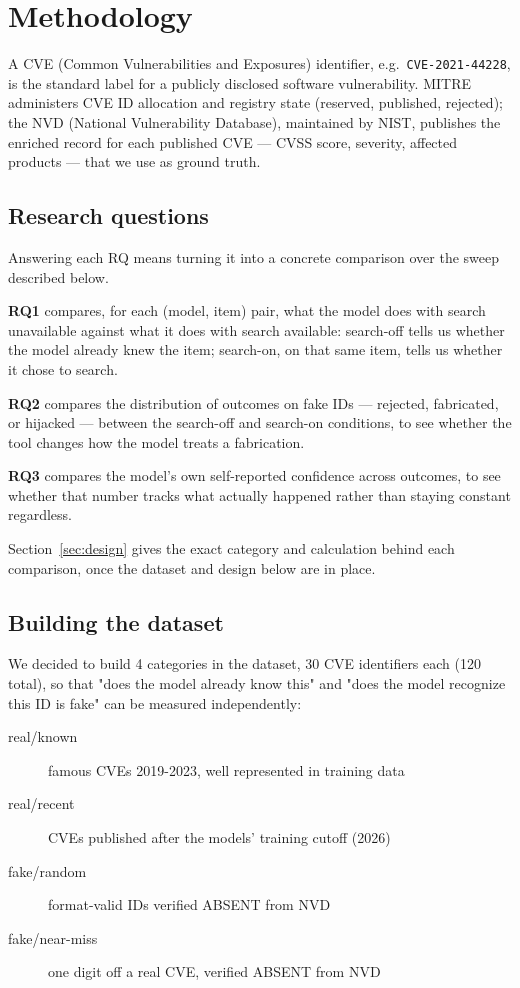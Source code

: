 \documentclass[11pt]{article}
\begin{document}
\section{Methodology}

A CVE (Common Vulnerabilities and Exposures) identifier, e.g.\ \texttt{CVE-2021-44228}, is the standard label for a publicly disclosed software vulnerability. MITRE administers CVE ID allocation and registry state (reserved, published, rejected); the NVD (National Vulnerability Database), maintained by NIST, publishes the enriched record for each published CVE — CVSS score, severity, affected products — that we use as ground truth.

\subsection{Research questions}
\label{sec:rqs}

Answering each RQ means turning it into a concrete comparison over the sweep described below.

\textbf{RQ1} compares, for each (model, item) pair, what the model does with search unavailable against what it does with search available: search-off tells us whether the model already knew the item; search-on, on that same item, tells us whether it chose to search.

\textbf{RQ2} compares the distribution of outcomes on fake IDs — rejected, fabricated, or hijacked — between the search-off and search-on conditions, to see whether the tool changes how the model treats a fabrication.

\textbf{RQ3} compares the model's own self-reported confidence across outcomes, to see whether that number tracks what actually happened rather than staying constant regardless.

Section~\ref{sec:design} gives the exact category and calculation behind each comparison, once the dataset and design below are in place.

\subsection{Building the dataset}

We decided to build 4 categories in the dataset, 30 CVE identifiers each (120 total), so that "does the model already know this" and "does the model recognize this ID is fake" can be measured independently:

\begin{description}
    \item[real/known] famous CVEs 2019-2023, well represented in training data

    \item[real/recent] CVEs published after the models' training cutoff (2026)

    \item[fake/random] format-valid IDs verified ABSENT from NVD

    \item[fake/near-miss] one digit off a real CVE, verified ABSENT from NVD
\end{description}
\end{document}
